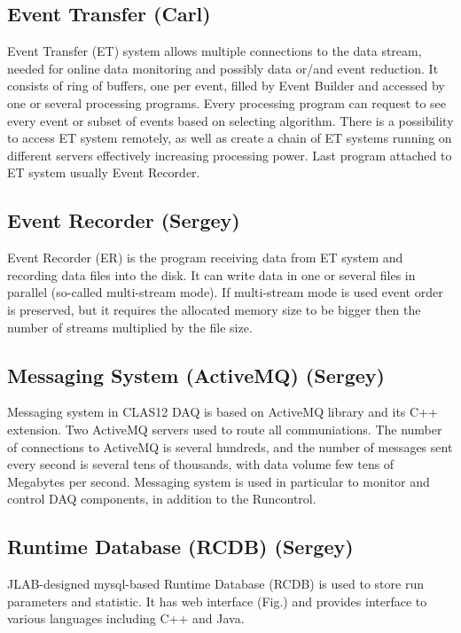 \subsection{Event Transfer (Carl)}

Event Transfer (ET) system allows multiple connections to the data stream, needed for online data monitoring and possibly data or/and event reduction. It consists of ring of buffers, one per event, filled by Event Builder and accessed by one or several processing programs. Every processing program can request to see every event or subset of events based on selecting algorithm. There is a possibility to access ET system remotely, as well as create a chain of ET systems running on different servers effectively increasing processing power. Last program attached to ET system usually Event Recorder.

\subsection{Event Recorder (Sergey)}

Event Recorder (ER) is the program receiving data from ET system and recording data files into the disk. It can write data in one or several files in parallel (so-called multi-stream mode). If multi-stream mode is used event order is preserved, but it requires the allocated memory size to be bigger then the number of streams multiplied by the file size.


\subsection{Messaging System (ActiveMQ) (Sergey)}

Messaging system in CLAS12 DAQ is based on ActiveMQ library and its C++ extension. Two ActiveMQ servers used to route all communiations. The number of connections to ActiveMQ is several hundreds, and the number of messages sent every second is several tens of thousands, with data volume few tens of Megabytes per second. Messaging system is used in particular to monitor and control DAQ components, in addition to the Runcontrol.


\subsection{Runtime Database (RCDB) (Sergey)}

JLAB-designed mysql-based Runtime Database (RCDB) is used to store run parameters and statistic. It has web interface (Fig.) and provides interface to various languages including C++ and Java.


